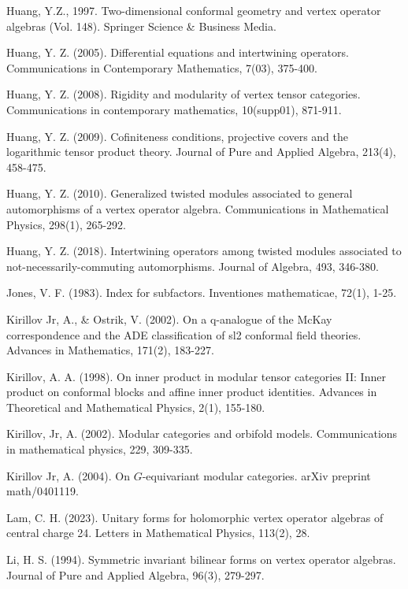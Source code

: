 \documentclass[11pt,b5paper,notitlepage]{article}
\theoremstyle{definition}
\theoremstyle{plain}
\numberwithin{equation}{section}
\begin{document}
\begin{thebibliography}{999999}
Huang, Y.Z., 1997. Two-dimensional conformal geometry and vertex operator algebras (Vol. 148). Springer Science \& Business Media.


Huang, Y. Z. (2005). Differential equations and intertwining operators. Communications in Contemporary Mathematics, 7(03), 375-400.


Huang, Y. Z. (2008). Rigidity and modularity of vertex tensor categories. Communications in contemporary mathematics, 10(supp01), 871-911.


Huang, Y. Z. (2009). Cofiniteness conditions, projective covers and the logarithmic tensor product theory. Journal of Pure and Applied Algebra, 213(4), 458-475.

Huang, Y. Z. (2010). Generalized twisted modules associated to general automorphisms of a vertex operator algebra. Communications in Mathematical Physics, 298(1), 265-292.

Huang, Y. Z. (2018). Intertwining operators among twisted modules associated to not-necessarily-commuting automorphisms. Journal of Algebra, 493, 346-380.

Jones, V. F. (1983). Index for subfactors. Inventiones mathematicae, 72(1), 1-25.



Kirillov Jr, A., \& Ostrik, V. (2002). On a q-analogue of the McKay correspondence and the ADE classification of sl2 conformal field theories. Advances in Mathematics, 171(2), 183-227.


Kirillov, A. A. (1998). On inner product in modular tensor categories II: Inner product on conformal blocks and affine inner product identities. Advances in Theoretical and Mathematical Physics, 2(1), 155-180.


Kirillov, Jr, A. (2002). Modular categories and orbifold models. Communications in mathematical physics, 229, 309-335.

Kirillov Jr, A. (2004). On $G$-equivariant modular categories. arXiv preprint math/0401119.


Lam, C. H. (2023). Unitary forms for holomorphic vertex operator algebras of central charge 24. Letters in Mathematical Physics, 113(2), 28.

Li, H. S. (1994). Symmetric invariant bilinear forms on vertex operator algebras. Journal of Pure and Applied Algebra, 96(3), 279-297.



\end{thebibliography}
\end{document}
